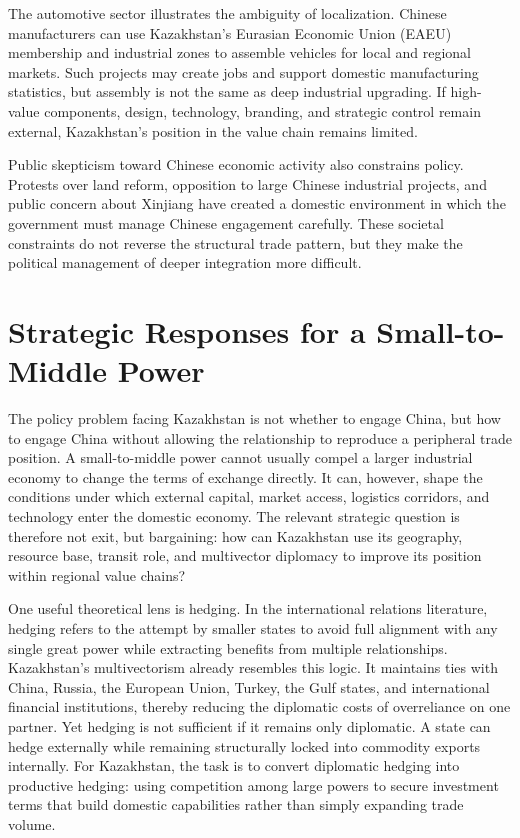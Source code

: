\documentclass[12pt]{article}
\begin{document}
The automotive sector illustrates the ambiguity of localization. Chinese manufacturers can use Kazakhstan's Eurasian Economic Union (EAEU) membership and industrial zones to assemble vehicles for local and regional markets. Such projects may create jobs and support domestic manufacturing statistics, but assembly is not the same as deep industrial upgrading. If high-value components, design, technology, branding, and strategic control remain external, Kazakhstan's position in the value chain remains limited.

Public skepticism toward Chinese economic activity also constrains policy. Protests over land reform, opposition to large Chinese industrial projects, and public concern about Xinjiang have created a domestic environment in which the government must manage Chinese engagement carefully. These societal constraints do not reverse the structural trade pattern, but they make the political management of deeper integration more difficult.

\section{Strategic Responses for a Small-to-Middle Power}

The policy problem facing Kazakhstan is not whether to engage China, but how to engage China without allowing the relationship to reproduce a peripheral trade position. A small-to-middle power cannot usually compel a larger industrial economy to change the terms of exchange directly. It can, however, shape the conditions under which external capital, market access, logistics corridors, and technology enter the domestic economy. The relevant strategic question is therefore not exit, but bargaining: how can Kazakhstan use its geography, resource base, transit role, and multivector diplomacy to improve its position within regional value chains?

One useful theoretical lens is hedging. In the international relations literature, hedging refers to the attempt by smaller states to avoid full alignment with any single great power while extracting benefits from multiple relationships. Kazakhstan's multivectorism already resembles this logic. It maintains ties with China, Russia, the European Union, Turkey, the Gulf states, and international financial institutions, thereby reducing the diplomatic costs of overreliance on one partner. Yet hedging is not sufficient if it remains only diplomatic. A state can hedge externally while remaining structurally locked into commodity exports internally. For Kazakhstan, the task is to convert diplomatic hedging into productive hedging: using competition among large powers to secure investment terms that build domestic capabilities rather than simply expanding trade volume.
\end{document}
